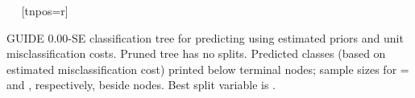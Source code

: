\documentclass[12pt]{article}
\begin{document}
 \begin{center}
 ~{}
    ~[tnpos=r]{}
 \end{center}
GUIDE  0.00-SE classification tree for predicting \texttt{} using
 estimated priors
 and unit misclassification costs.
Pruned tree has no splits.
Predicted classes (based on estimated misclassification cost)
printed below terminal nodes;
 sample sizes for \texttt{} =
 \texttt{} and \texttt{}, respectively, beside nodes.
Best split variable is \texttt{}.
 
\end{document}
